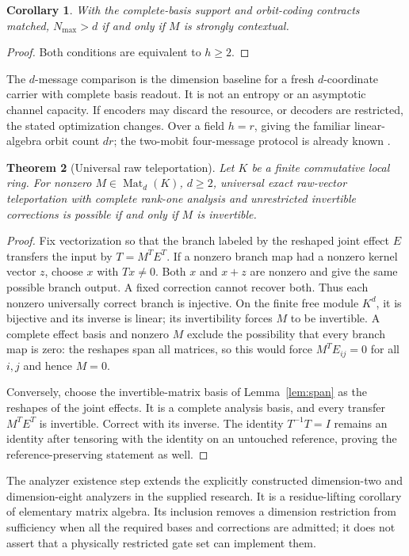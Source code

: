 \documentclass[11pt]{article}
\newtheorem{theorem}{Theorem}[section]
\newtheorem{corollary}[theorem]{Corollary}
\theoremstyle{definition}\newtheorem{definition}[theorem]{Definition}
\theoremstyle{remark}\newtheorem{remark}[theorem]{Remark}
\DeclareMathOperator{\Mat}{Mat}
\begin{document}
\begin{corollary}\label{cor:equiv}
With the complete-basis support and orbit-coding contracts matched, $N_{\max}>d$ if and only if $M$ is strongly contextual.
\end{corollary}
\begin{proof}
Both conditions are equivalent to $h\geq2$.
\end{proof}
The $d$-message comparison is the dimension baseline for a fresh $d$-coordinate carrier with complete basis readout. It is not an entropy or an asymptotic channel capacity. If encoders may discard the resource, or decoders are restricted, the stated optimization changes. Over a field $h=r$, giving the familiar linear-algebra orbit count $dr$; the two-mobit four-message protocol is already known \cite{Schumacher2010}.

\begin{theorem}[Universal raw teleportation]\label{thm:teleport}
Let $K$ be a finite commutative local ring. For nonzero $M\in\Mat_d(K)$, $d\geq2$, universal exact raw-vector teleportation with complete rank-one analysis and unrestricted invertible corrections is possible if and only if $M$ is invertible.
\end{theorem}
\begin{proof}
Fix vectorization so that the branch labeled by the reshaped joint effect $E$ transfers the input by $T=M^TE^T$. If a nonzero branch map had a nonzero kernel vector $z$, choose $x$ with $Tx\ne0$. Both $x$ and $x+z$ are nonzero and give the same possible branch output. A fixed correction cannot recover both. Thus each nonzero universally correct branch is injective. On the finite free module $K^d$, it is bijective and its inverse is linear; its invertibility forces $M$ to be invertible. A complete effect basis and nonzero $M$ exclude the possibility that every branch map is zero: the reshapes span all matrices, so this would force $M^TE_{ij}=0$ for all $i,j$ and hence $M=0$.

Conversely, choose the invertible-matrix basis of Lemma~\ref{lem:span} as the reshapes of the joint effects. It is a complete analysis basis, and every transfer $M^TE^T$ is invertible. Correct with its inverse. The identity $T^{-1}T=I$ remains an identity after tensoring with the identity on an untouched reference, proving the reference-preserving statement as well.
\end{proof}

The analyzer existence step extends the explicitly constructed dimension-two and dimension-eight analyzers in the supplied research. It is a residue-lifting corollary of elementary matrix algebra. Its inclusion removes a dimension restriction from sufficiency when all the required bases and corrections are admitted; it does not assert that a physically restricted gate set can implement them.
\end{document}
